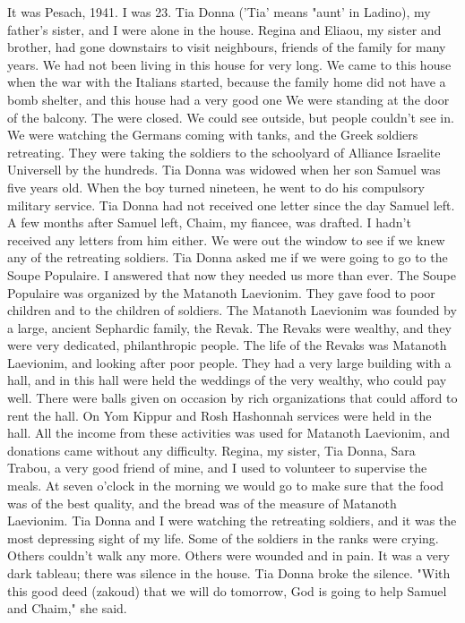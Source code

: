 It was Pesach, 1941.
I was 23.
Tia Donna ('Tia' means "aunt'  in Ladino), my father's sister, and I were alone in the house.
Regina and Eliaou, my sister and brother, had gone downstairs to visit neighbours, friends of the family for many years.
We had not been living in this house for very long.
We came to this house when the war with the Italians started, because the family home did not have a bomb shelter, and this house had a very good one
We were standing at the door of the balcony.
The were closed.
We could see outside, but people couldn't see in.
We were watching the Germans coming with tanks, and the Greek soldiers retreating.
They were taking the soldiers to the schoolyard of Alliance Israelite Universell by the hundreds.
Tia Donna was widowed when her son Samuel was five years old.
When the boy turned nineteen, he went to do his compulsory military service.
Tia Donna had not received one letter since the day Samuel left.
A few months after Samuel left, Chaim, my fiancee, was drafted.
I hadn't received any letters from him either.
We were out the window to see if we knew any of the retreating soldiers.
Tia Donna asked me if we were going to go to the Soupe Populaire.
I answered that now they needed us more than ever.
The Soupe Populaire was organized by the Matanoth Laevionim.
They gave food to  poor children and to the children of soldiers.
The Matanoth Laevionim was founded by a large, ancient Sephardic family, the Revak.
The Revaks were wealthy, and they were very dedicated, philanthropic people.
The life of the Revaks was Matanoth Laevionim, and looking after poor people.
They had a very large building with a hall, and 
in this hall were held the weddings of the very wealthy, who could pay well.
There were balls given on occasion by rich organizations that could afford to rent the hall.
On Yom Kippur and Rosh Hashonnah services were held in the hall.
All the income from these activities was used for Matanoth Laevionim, and donations came without 
any difficulty.
Regina, my sister, Tia Donna, Sara Trabou, a very good 
friend of mine, and I used to volunteer to supervise the meals.
At seven o'clock in the morning we would go to make sure that the food was of the best quality, and the bread was of the measure of Matanoth Laevionim.
Tia Donna and I were watching the retreating soldiers, and it was the most depressing sight of my life.
Some of the soldiers in the ranks were crying.
Others couldn't walk any more.
Others were wounded and in pain.
It was a very dark tableau; there was silence in the house.
Tia Donna broke the silence.
"With this good deed (zakoud) that we will do tomorrow, God is going to help Samuel and Chaim," she said.
